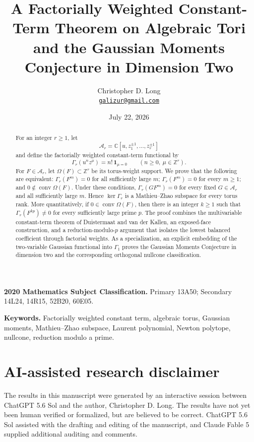 \documentclass[11pt]{article}
\title{A Factorially Weighted Constant-Term Theorem on Algebraic Tori\\
\large and the Gaussian Moments Conjecture in Dimension Two}
\author{Christopher D. Long\\[2pt]
\href{mailto:galizur@gmail.com}{\texttt{galizur@gmail.com}}}
\date{July 22, 2026}
\numberwithin{equation}{section}
\theoremstyle{definition}
\theoremstyle{remark}
\newcommand{\C}{\mathbb C}
\newcommand{\Z}{\mathbb Z}
\newcommand{\A}{\mathcal A}
\newcommand{\conv}{\operatorname{conv}}
\begin{document}
\maketitle

\begin{abstract}
For an integer $r\ge 1$, let
\[
  \A_r=\C[u,z_1^{\pm1},\ldots,z_r^{\pm1}]
\]
and define the factorially weighted constant-term functional by
\[
  \Gamma_r(u^n z^\mu)=n!\,\mathbf 1_{\mu=0}
  \qquad(n\ge0,\ \mu\in\Z^r).
\]
For $F\in\A_r$, let $\Omega(F)\subset\Z^r$ be its torus-weight support.  We
prove that the following are equivalent: $\Gamma_r(F^m)=0$ for all
sufficiently large $m$; $\Gamma_r(F^m)=0$ for every $m\ge1$; and
$0\notin\conv\Omega(F)$.  Under these conditions,
$\Gamma_r(GF^m)=0$ for every fixed $G\in\A_r$ and all sufficiently large
$m$.  Hence $\ker\Gamma_r$ is a Mathieu--Zhao subspace for every torus rank.
More quantitatively, if $0\in\conv\Omega(F)$, then there is an integer
$k\ge1$ such that $\Gamma_r(F^{kp})\ne0$ for every sufficiently large prime
$p$.  The proof combines the multivariable constant-term theorem of
Duistermaat and van der Kallen, an exposed-face construction, and a
reduction-modulo-$p$ argument that isolates the lowest balanced coefficient
through factorial weights.  As a specialization, an explicit embedding of
the two-variable Gaussian functional into $\Gamma_1$ proves the Gaussian
Moments Conjecture in dimension two and the corresponding orthogonal
nullcone classification.
\end{abstract}

\medskip
\noindent\textbf{2020 Mathematics Subject Classification.}
Primary 13A50; Secondary 14L24, 14R15, 52B20, 60E05.

\smallskip
\noindent\textbf{Keywords.}
Factorially weighted constant term, algebraic torus, Gaussian moments,
Mathieu--Zhao subspace, Laurent polynomial, Newton polytope, nullcone,
reduction modulo a prime.

\section*{AI-assisted research disclaimer}
The results in this manuscript were generated by an interactive session
between ChatGPT 5.6 Sol and the author, Christopher D. Long.  The results
have not yet been human verified or formalized, but are believed to be
correct.  ChatGPT 5.6 Sol assisted with the drafting and editing of the
manuscript, and Claude Fable 5 supplied additional auditing and comments.
\end{document}
